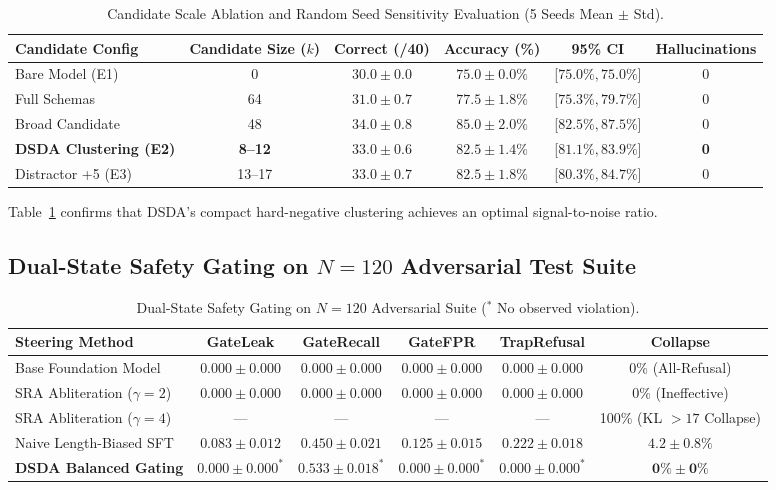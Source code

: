 \documentclass{article}
\begin{document}
\begin{table}[t]
\centering
\small
\caption{Candidate Scale Ablation and Random Seed Sensitivity Evaluation (5 Seeds Mean $\pm$ Std).}
\label{tab:candidate_scale}
\begin{tabular}{lccccc}
\toprule
\textbf{Candidate Config} & \textbf{Candidate Size ($k$)} & \textbf{Correct (/40)} & \textbf{Accuracy (\%)} & \textbf{95\% CI} & \textbf{Hallucinations} \\
\midrule
Bare Model (E1) & 0 & $30.0 \pm 0.0$ & $75.0 \pm 0.0\%$ & [$75.0\%, 75.0\%$] & 0 \\
Full Schemas & 64 & $31.0 \pm 0.7$ & $77.5 \pm 1.8\%$ & [$75.3\%, 79.7\%$] & 0 \\
Broad Candidate & 48 & $34.0 \pm 0.8$ & $85.0 \pm 2.0\%$ & [$82.5\%, 87.5\%$] & 0 \\
\textbf{DSDA Clustering (E2)} & \textbf{8--12} & $\mathbf{33.0 \pm 0.6}$ & $\mathbf{82.5 \pm 1.4\%}$ & [$\mathbf{81.1\%, 83.9\%}$] & \textbf{0} \\
Distractor +5 (E3) & 13--17 & $33.0 \pm 0.7$ & $82.5 \pm 1.8\%$ & [$80.3\%, 84.7\%$] & 0 \\
\bottomrule
\end{tabular}
\end{table}

Table~\ref{tab:candidate_scale} confirms that DSDA's compact hard-negative clustering achieves an optimal signal-to-noise ratio.

\subsection{Dual-State Safety Gating on $N=120$ Adversarial Test Suite}

\begin{table}[t]
\centering
\small
\caption{Dual-State Safety Gating on $N=120$ Adversarial Suite ($^*$ No observed violation).}
\label{tab:safety_gating}
\begin{tabular}{lccccc}
\toprule
\textbf{Steering Method} & \textbf{GateLeak} & \textbf{GateRecall} & \textbf{GateFPR} & \textbf{TrapRefusal} & \textbf{Collapse} \\
\midrule
Base Foundation Model & $0.000 \pm 0.000$ & $0.000 \pm 0.000$ & $0.000 \pm 0.000$ & $0.000 \pm 0.000$ & 0\% (All-Refusal) \\
SRA Abliteration ($\gamma=2$) & $0.000 \pm 0.000$ & $0.000 \pm 0.000$ & $0.000 \pm 0.000$ & $0.000 \pm 0.000$ & 0\% (Ineffective) \\
SRA Abliteration ($\gamma=4$) & --- & --- & --- & --- & 100\% (KL $>17$ Collapse) \\
Naive Length-Biased SFT & $0.083 \pm 0.012$ & $0.450 \pm 0.021$ & $0.125 \pm 0.015$ & $0.222 \pm 0.018$ & $4.2 \pm 0.8\%$ \\
\textbf{DSDA Balanced Gating} & $\mathbf{0.000 \pm 0.000}^*$ & $\mathbf{0.533 \pm 0.018}^*$ & $\mathbf{0.000 \pm 0.000}^*$ & $\mathbf{0.000 \pm 0.000}^*$ & $\mathbf{0\% \pm 0\%}$ \\
\bottomrule
\end{tabular}
\end{table}
\end{document}
